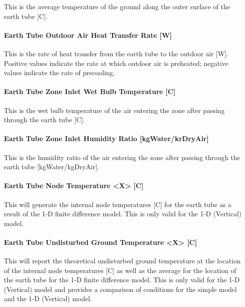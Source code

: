 This is the average temperature of the ground along the outer surface of the earth tube {[}C{]}.

\paragraph{Earth Tube Outdoor Air Heat Transfer Rate {[}W{]}}\label{earth-tube-outdoor-air-heat-transfer-rate-w}

This is the rate of heat transfer from the earth tube to the outdoor air {[}W{]}.~ Positive values indicate the rate at which outdoor air is preheated; negative values indicate the rate of precooling.

\paragraph{Earth Tube Zone Inlet Wet Bulb Temperature {[}C{]}}\label{earth-tube-zone-inlet-wet-bulb-temperature-c}

This is the wet bulb temperature of the air entering the zone after passing through the earth tube {[}C{]}.

\paragraph{Earth Tube Zone Inlet Humidity Ratio {[}kgWater/krDryAir{]}}\label{earth-tube-zone-inlet-humidity-ratio-kgWater-kgDryAir}

This is the humidity ratio of the air entering the zone after passing through the earth tube {[}kgWater/kgDryAir{]}.

\paragraph{Earth Tube Node Temperature <X> {[}C{]}}\label{earth-tube-node-temperatures-c}

This will generate the internal node temperatures {[}C{]} for the earth tube as a result of the 1-D finite difference model.  This is only valid for the 1-D (Vertical) model.

\paragraph{Earth Tube Undisturbed Ground Temperature <X> {[}C{]}}\label{earth-tube-undisturbed-node-temperatures-c}

This will report the theoretical undisturbed ground temperature at the location of the internal node temperatures {[}C{]} as well as the average for the location of the earth tube for the 1-D finite difference model.  This is only valid for the 1-D (Vertical) model and provides a comparison of conditions for the simple model and the 1-D (Vertical) model.


